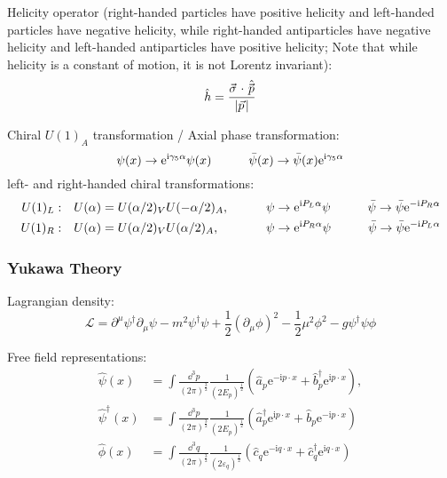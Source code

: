 			\noindent
			Helicity operator (\ie right-handed particles have positive helicity and left-handed particles have negative helicity, while right-handed antiparticles have negative helicity and left-handed antiparticles have positive helicity; Note that while helicity is a constant of motion, it is not Lorentz invariant):
			\begin{equation}
				\hat{h} = \frac{\vec{\sigma}\cdot\hat{\vec{p}}}{\abs{\vec{p}}}
			\end{equation}

			\noindent
			Chiral $U(1)_A$ transformation / Axial phase transformation:
			\begin{equation}
				\psi(x) \to \mathrm{e}^{\mathrm{i} \gamma_5 \alpha} \psi(x)
				\hspace{30pt} \bar{\psi}(x) \to \bar{\psi}(x) \mathrm{e}^{\mathrm{i} \gamma_5 \alpha}
			\end{equation}
			left- and right-handed chiral transformations:
			\begin{align}
				U(1)_L:&\quad U(\alpha) = U(\alpha/2)_V U(-\alpha/2)_A,
				\hspace{30pt} \psi \to \mathrm{e}^{\mathrm{i} P_L \alpha} \psi
				\hspace{30pt} \bar{\psi} \to \bar{\psi} \mathrm{e}^{-\mathrm{i} P_R \alpha} \\
				U(1)_R:&\quad U(\alpha) = U(\alpha/2)_V U(\alpha/2)_A, \phantom{-}
				\hspace{30pt} \psi \to \mathrm{e}^{\mathrm{i} P_R \alpha} \psi
				\hspace{30pt} \bar{\psi} \to \bar{\psi} \mathrm{e}^{-\mathrm{i} P_L \alpha}
			\end{align}


		\subsubsection{Yukawa Theory}
			Lagrangian density:
			\begin{equation}
				\mathcal{L}=\partial^{\mu}\psi^{\dagger}\partial_{\mu}\psi-m^{2}\psi^{\dagger}\psi+\frac{1}{2}(\partial_{\mu}\phi)^{2}-\frac{1}{2}\mu^{2}\phi^{2}-g\psi^{\dagger}\psi\phi
			\end{equation}

			\noindent
			Free field representations:
			\begin{equation}
				\begin{aligned}
					\hat{\psi}(x) &= \int\frac{\dd^{3}p}{\left(2\pi\right)^{\frac{3}{2}}}\frac{1}{(2E_{p})^{\frac{1}{2}}}\left(\hat{a}_{p}\mathrm{e}^{-\mathrm{i}p\cdot x}+\hat{b}_{p}^{\dagger}\mathrm{e}^{\mathrm{i}p\cdot x}\right), \\
					\hat{\psi}^{\dagger}(x) &= \int\frac{\dd^{3}p}{(2\pi)^{\frac{3}{2}}}\frac{1}{(2E_{p})^{\frac{1}{2}}}\left(\hat{a}_{p}^{\dagger}\mathrm{e}^{\mathrm{i}p\cdot x}+\hat{b}_{p}\mathrm{e}^{-\mathrm{i}p\cdot x}\right) \\
					\hat{\phi}(x) &=\int\frac{\dd^{3}q}{\left(2\pi\right)^{\frac{3}{2}}}\frac{1}{\left(2\varepsilon_{q}\right)^{\frac{1}{2}}}\left(\hat{c}_{q}\mathrm{e}^{-\mathrm{i}q\cdot x}+\hat{c}_{q}^{\dagger}\mathrm{e}^{\mathrm{i}q\cdot x}\right) \\
				\end{aligned}
			\end{equation}

